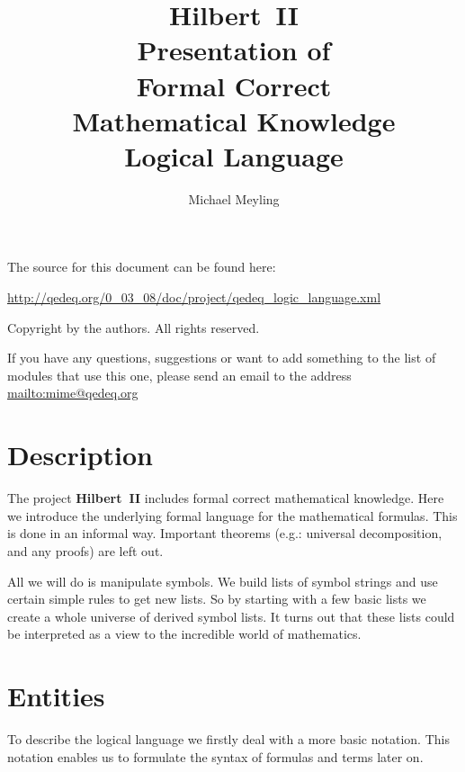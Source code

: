 \documentclass[a4paper,german,10pt,twoside]{book}
\title{\textbf{Hilbert~II} \\
\vspace*{1cm} 
Presentation of \\ 
Formal Correct \\
Mathematical Knowledge \\
\vspace*{1cm} Logical Language}
\author{
Michael Meyling
}
\theoremstyle{definition}
\theoremstyle{remark}
\begin{document}
\maketitle

\setlength{\parskip}{5pt plus 2pt minus 1pt}
\mbox{}
\vfill

\par
The source for this document can be found here:
\par
\url{http://qedeq.org/0_03_08/doc/project/qedeq_logic_language.xml}

\par
Copyright by the authors. All rights reserved.
\par
If you have any questions, suggestions or want to add something to the list of modules that use this one, please send an email to the address \url{mailto:mime@qedeq.org}

\setlength{\parskip}{0pt}
\tableofcontents

\setlength{\parskip}{5pt plus 2pt minus 1pt}

\chapter*{Description} \label{chapter0} \hypertarget{chapter0}{}

The project \textbf{Hilbert~II} includes formal correct mathematical knowledge. Here we introduce the underlying formal language for the mathematical formulas. This is done in an informal way. Important theorems (e.g.: universal decomposition, and any proofs) are left out.

\par
All we will do is manipulate symbols. We build lists of symbol strings and use certain simple rules to get new lists. So by starting with a few basic lists we create a whole universe of derived symbol lists. 
It turns out that these lists could be interpreted as a view to the incredible world of mathematics.


\chapter{Entities} \label{chapter1} \hypertarget{chapter1}{}

To describe the logical language we firstly deal with a more basic notation. This notation enables us to formulate the syntax of formulas and terms later on.
\end{document}

